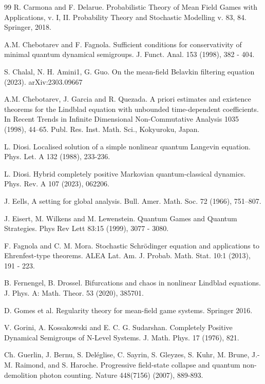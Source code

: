 \documentclass[12pt]{article}
\begin{document}
\begin{thebibliography}{99}
 R. Carmona and F. Delarue. Probabilistic Theory
of Mean Field Games with Applications, v. I, II.
Probability Theory and Stochastic Modelling v. 83, 84. Springer, 2018.

A.M. Chebotarev and F. Fagnola. Sufficient conditions for conservativity of
minimal quantum dynamical semigroups. J. Funct. Anal. 153 (1998), 382 - 404.

S. Chalal, N. H. Amini1, G. Guo.
On the mean-field Belavkin filtering equation (2023).
arXiv:2303.09667

A.M. Chebotarev, J. Garcia and R. Quezada.
 A priori estimates and existence
theorems for the Lindblad equation with unbounded time-dependent coefficients. In Recent
Trends in Infinite Dimensional Non-Commutative Analysis 1035 (1998), 44–65. Publ. Res.
Inst. Math. Sci., Kokyuroku, Japan.


L. Diosi. Localised solution of a simple nonlinear quantum Langevin
equation. Phys. Let. A 132 (1988), 233-236.

L. Diosi.
Hybrid completely positive Markovian quantum-classical dynamics.
 Phys. Rev. A 107 (2023), 062206.

J. Eells, A setting for global analysis. Bull. Amer. Math. Soc. 72 (1966), 751–807.

 J. Eisert, M. Wilkens and M. Lewenstein.
Quantum Games and Quantum Strategies. Phys Rev Lett 83:15 (1999), 3077 - 3080.


F. Fagnola and C. M. Mora.
Stochastic Schr\"odinger equation and applications to Ehrenfest-type theorems.
  ALEA Lat. Am. J. Probab. Math. Stat. 10:1 (2013), 191 - 223.

B. Fernengel, B. Drossel.
Bifurcations and chaos in nonlinear Lindblad equations.
J. Phys. A: Math. Theor. 53 (2020), 385701.

 D. Gomes et al.
Regularity theory for mean-field game systems.
Springer 2016.

V. Gorini, A. Kossakowski and E. C. G. Sudarshan.
Completely Positive Dynamical Semigroups of N-Level Systems.
 J. Math. Phys. 17 (1976), 821.

Ch. Guerlin, J. Bernu, S. Del\'eglise, C. Sayrin, S. Gleyzes,
 S. Kuhr, M. Brune, J.-M. Raimond, and S. Haroche.
Progressive field-state collapse and quantum non-demolition photon counting.
 Nature 448(7156) (2007), 889-893.



\end{thebibliography}
\end{document}
